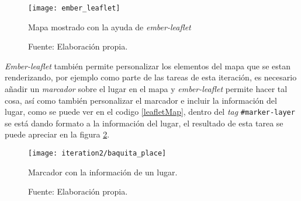 \begin{figure}[H]
     \begin{center}
       \texttt{[image: ember\_leaflet]}

       \caption{ Mapa mostrado con la ayuda de \emph{ember-leaflet}}
       \label{fig:ember_leaflet}
       \caption*{Fuente: Elaboración propia.}
     \end{center}
\end{figure}


\emph{Ember-leaflet} también permite personalizar los elementos del mapa que se estan renderizando, por ejemplo como parte de las tareas de esta iteración, es necesario añadir un \emph{marcador} sobre el lugar en el mapa y  \emph{ember-leaflet} permite hacer tal cosa, así como también personalizar el marcador e incluir la información del lugar, como se puede ver en el codigo \ref{leafletMap}, dentro del \emph{tag} \verb|#marker-layer| se está dando formato a la información del lugar, el resultado de esta tarea se puede apreciar en la figura \ref{fig:baquita_place}. \\


\begin{figure}[H]
 \begin{center}
   \texttt{[image: iteration2/baquita\_place]}
   \caption{Marcador con la información de un lugar.}
   \label{fig:baquita_place}
   \caption*{Fuente: Elaboración propia.}
 \end{center}
\end{figure}











